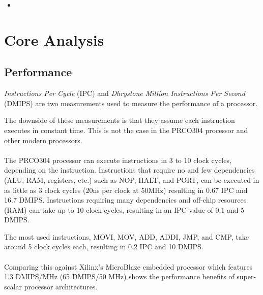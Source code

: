 \documentclass[11pt,a4paper]{report}
\newcommand{\scname}{PRCO304}
\begin{document}
\begin{itemize}
{The \scname{} processor core features a single-step input line that can be pulsed to signal the core to execute the next instruction. In these tests, generally the first register Ax is redirected to the 8 LEDs on the development board, allowing the tester to visually see it's contents. However, only the higher-or-lower byte can be viewed at any single time (as registers are 16-bits wide). UART printing is also used to visualise register contents, however, integer to ASCII conversion is not implemented so only single digits can be displayed in ASCII.}

\item{
}
\end{itemize}



\newpage
\section{Core Analysis}
\label{sect:core_analysis}
\subsection{Performance}
\textit{Instructions Per Cycle} (IPC) and \textit{Dhrystone Million Instructions Per Second} (DMIPS) are two measurements used to measure the performance of a processor.

The downside of these measurements is that they assume each instruction executes in constant time. This is not the case in the \scname{} processor and other modern processors.
\\\\
The \scname{} processor can execute instructions in 3 to 10 clock cycles, depending on the instruction. Instructions that require no and few dependencies (ALU, RAM, registers, etc.) such as NOP, HALT, and PORT, can be executed in as little as 3 clock cycles (20ns per clock at 50MHz) resulting in 0.67 IPC and 16.7 DMIPS. Instructions requiring many dependencies and off-chip resources (RAM) can take up to 10 clock cycles, resulting in an IPC value of 0.1 and 5 DMIPS.

The most used instructions, MOVI, MOV, ADD, ADDI, JMP, and CMP, take around 5 clock cycles each, resulting in 0.2 IPC and 10 DMIPS.
\\\\
Comparing this against Xilinx's MicroBlaze embedded processor which features 1.3 DMIPS/MHz (65 DMIPS/50 MHz) shows the performance benefits of super-scalar processor architectures. 
\end{document}
